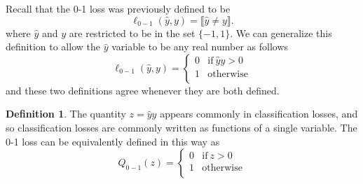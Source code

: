 \documentclass[10pt]{exam}
\theoremstyle{definition}
\newtheorem{defn}{Definition}
\DeclareMathOperator{\sign}{sign}
\newcommand{\x}{\mathbf x}
\newcommand{\y}{\mathbf y}
\begin{document}
Recall that the 0-1 loss was previously defined to be
\begin{equation}
    \ell_{0-1}(\hat y, y) = \llbracket \hat y \ne y \rrbracket
    .
\end{equation}
where $\hat y$ and $y$ are restricted to be in the set $\{-1, 1\}$.
We can generalize this definition to allow the $\hat y$ variable to be any real number as follows
\begin{equation}
    \ell_{0-1}(\hat y, y)
    =
    \begin{cases}
        0 & \text{if}~\hat y y > 0 \\
        1 & \text{otherwise} \\
    \end{cases}
\end{equation}
and these two definitions agree whenever they are both defined.


\vspace{0.1in}


\newpage
\begin{defn}
The quantity $z = \hat y y$ appears commonly in classification losses, and so classification losses are commonly written as functions of a single variable.
The 0-1 loss can be equivalently defined in this way as
\begin{equation}
    Q_{0-1}(z)
    =
    \begin{cases}
        0 & \text{if}~z > 0 \\
        1 & \text{otherwise} \\
    \end{cases}
\end{equation}
\end{defn}
\end{document}
